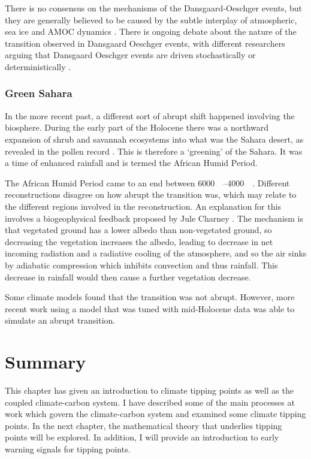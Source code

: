 There is no consensus on the mechanisms of the Dansgaard-Oeschger events, but they are generally believed to be caused by the subtle interplay of atmospheric, sea ice and AMOC dynamics
\parencite{Vettoretti2022,Boers2018,Riechers2023arxiv}. There is ongoing debate about the nature of the transition observed in Dansgaard Oeschger events, with different researchers arguing
that Dansgaard Oeschger events are driven stochastically \parencite{Ditlevsen2010,Ditlevsen1999} or deterministically \parencite{Boers2018a}.

\subsubsection{Green Sahara}
In the more recent past, a different sort of abrupt shift happened involving the biosphere. During the early part of the Holocene there was a northward expansion of shrub and savannah ecosystems
into what was the Sahara desert, as revealed in the pollen record \parencite{Hoelzmann1998,Hely2014}. This is therefore a `greening' of the Sahara. It was a time of enhanced rainfall \parencite{Tierney2017}
and is termed the African Humid Period.

The African Humid Period came to an end between \SIrange{6000}{4000}{\year\beforepresent}. Different reconstructions \parencite{Shanahan2015,Kropelin2008} disagree on how abrupt the transition
was, which may relate to the different regions involved in the reconstruction. An explanation for this 
involves a biogeophysical feedback proposed by Jule Charney \parencite{Charney1975,Charney1975a}. The mechanism is that vegetated ground has a lower
albedo than non-vegetated ground, so decreasing the vegetation increases the albedo, leading to decrease in net incoming radiation and a radiative cooling of the atmosphere, and so the air sinks by adiabatic compression
which inhibits convection and thus rainfall. This decrease in rainfall would then cause a further vegetation decrease.

Some climate models \parencite{Renssen2006} found that the transition was not abrupt. However, more recent work \parencite{Hopcroft2021} using a model that was tuned with mid-Holocene data was able to simulate an abrupt transition.

\section{Summary}
This chapter has given an introduction to climate tipping points as well as the coupled climate-carbon system. I have described some of the main processes at work
which govern the climate-carbon system and examined some climate tipping points. In the next chapter, the mathematical theory that underlies tipping points will be explored.
In addition, I will provide an introduction to early warning signals for tipping points.